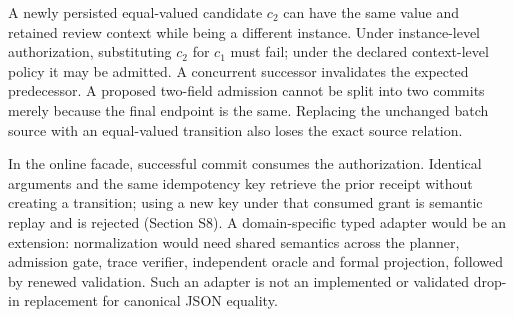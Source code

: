 \documentclass[11pt,a4paper]{article}
\begin{document}
A newly persisted equal-valued candidate $c_2$ can have the same value and retained review context while being a different instance. Under instance-level authorization, substituting $c_2$ for $c_1$ must fail; under the declared context-level policy it may be admitted. A concurrent successor invalidates the expected predecessor. A proposed two-field admission cannot be split into two commits merely because the final endpoint is the same. Replacing the unchanged batch source with an equal-valued transition also loses the exact source relation.

In the online facade, successful commit consumes the authorization. Identical arguments and the same idempotency key retrieve the prior receipt without creating a transition; using a new key under that consumed grant is semantic replay and is rejected (Section S8). A domain-specific typed adapter would be an extension: normalization would need shared semantics across the planner, admission gate, trace verifier, independent oracle and formal projection, followed by renewed validation. Such an adapter is not an implemented or validated drop-in replacement for canonical JSON equality.
\end{document}
